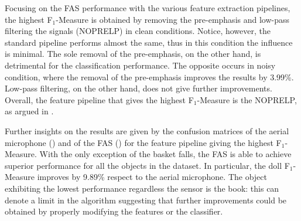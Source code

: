 Focusing on the FAS performance with the various feature extraction pipelines, the highest F$_1$-Measure is obtained by removing the pre-emphasis and low-pass filtering the signals (NOPRELP) in clean conditions. Notice, however, the standard pipeline performs almost the same, thus in this condition the influence is minimal. The sole removal of the pre-emphasis, on the other hand, is detrimental for the classification performance. The opposite occurs in noisy condition, where the removal of the pre-emphasis improves the results by 3.99\%. Low-pass filtering, on the other hand, does not give further improvements. Overall, the feature pipeline that gives the highest F$_1$-Measure is the NOPRELP, as argued in .

Further insights on the results are given by the confusion matrices of the aerial microphone () and of the FAS () for the feature pipeline giving the highest F$_1$-Measure. With the only exception of the basket falls, the FAS is able to achieve superior performance for all the objects in the dataset. In particular, the doll F$_1$-Measure improves by 9.89\% respect to the aerial microphone. The object exhibiting the lowest performance regardless the sensor is the book: this can denote a limit in the algorithm suggesting that further improvements could be obtained by properly modifying the features or the classifier.


